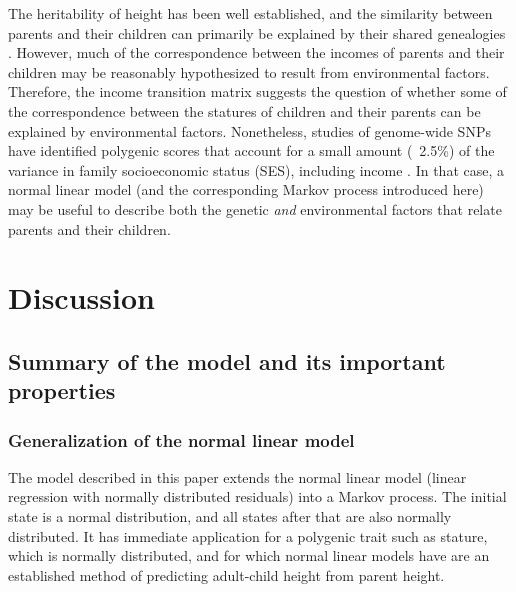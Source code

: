 \documentclass[a4paper,11pt]{article} %
\begin{document}
The heritability of height has been well established, and the similarity between parents and their children can primarily be explained by their shared genealogies \cite{luo, preece, wood}. However, much of the correspondence between the incomes of parents and their children may be reasonably hypothesized to result from environmental factors. Therefore, the income transition matrix suggests the question of whether some of the correspondence between the statures of children and their parents can be explained by environmental factors. Nonetheless, studies of genome-wide SNPs have identified polygenic scores that account for a small amount (~2.5\%) of the variance in family socioeconomic status (SES), including income \cite{trzaskowski, krapohl}. In that case, a normal linear model (and the corresponding Markov process introduced here) may be useful to describe both the genetic \emph{and} environmental factors that relate parents and their children.



\section{Discussion}

\subsection{Summary of the model and its important properties}

\subsubsection*{Generalization of the normal linear model}

The model described in this paper extends the normal linear model (linear regression with normally distributed residuals) into a Markov process. The initial state is a normal distribution, and all states after that are also normally distributed. It has immediate application for a polygenic trait such as stature, which is normally distributed, and for which normal linear models have are an established method of predicting adult-child height from parent height.
\end{document}
